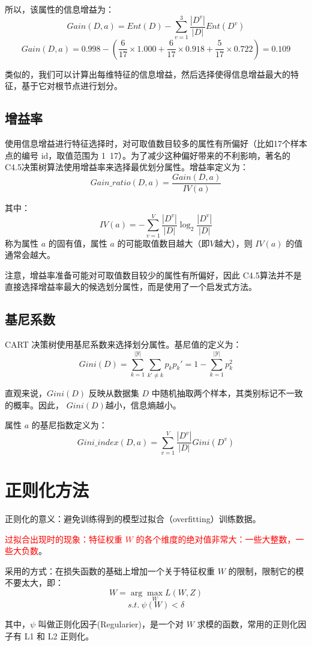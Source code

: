 \documentclass[12pt]{article}
\begin{document}
所以，该属性的信息增益为：
$$
Gain(D,a) = Ent(D) - \sum_{v=1}^3\frac{|D^v|}{|D|}Ent(D^v)
$$
$$
Gain(D,a) = 0.998 - (\frac{6}{17}\times1.000 + \frac{6}{17}\times0.918+\frac{5}{17}\times0.722)
= 0.109
$$

类似的，我们可以计算出每维特征的信息增益，然后选择使得信息增益最大的特征，基于它对根节点进行划分。

\subsection{增益率}
使用信息增益进行特征选择时，对可取值数目较多的属性有所偏好（比如17个样本点的编号 id，取值范围为 1~17）。为了减少这种偏好带来的不利影响，著名的 C4.5决策树算法使用增益率来选择最优划分属性。增益率定义为：
$$
Gain\_ratio(D,a) = \frac{Gain(D,a)}{IV(a)}
$$

其中：
$$
IV(a) = -\sum_{v=1}^V\frac{|D^v|}{|D|}\log_2\frac{|D^v|}{|D|}
$$
称为属性 $a$ 的固有值，属性 $a$ 的可能取值数目越大（即$V$越大），则 $IV(a)$ 的值通常会越大。

注意，增益率准备可能对可取值数目较少的属性有所偏好，因此 C4.5算法并不是直接选择增益率最大的候选划分属性，而是使用了一个启发式方法。

\subsection{基尼系数}
CART 决策树使用基尼系数来选择划分属性。基尼值的定义为：
$$
Gini(D) = \sum_{k=1}^{|\mathcal{Y}|}\sum_{k'\neq k}p_kp_k' = 1 - \sum_{k=1}^{|\mathcal{Y}|}p_k^2
$$

直观来说，$Gini(D)$ 反映从数据集 $D$ 中随机抽取两个样本，其类别标记不一致的概率。因此， $Gini(D)$越小，信息熵越小。

属性 $a$ 的基尼指数定义为：
$$
Gini\_index(D,a) = \sum_{v=1}^{V}\frac{|D^v|}{|D|}Gini(D^v)
$$

\section{正则化方法}
正则化的意义：避免训练得到的模型过拟合（overfitting）训练数据。

\textcolor{red}{过拟合出现时的现象：特征权重 
$W$ 的各个维度的绝对值非常大：一些大整数，一些大负数}。

采用的方式：在损失函数的基础上增加一个关于特征权重 $W$ 的限制，限制它的模不要太大，即：
$$
W = \arg\max_WL(W,Z)
$$
$$
s.t. \ \psi(W) < \delta
$$

其中，$\psi$ 叫做正则化因子(Regularier)，是一个对 $W$ 求模的函数，常用的正则化因子有 L1 和 L2 正则化。
\end{document}
